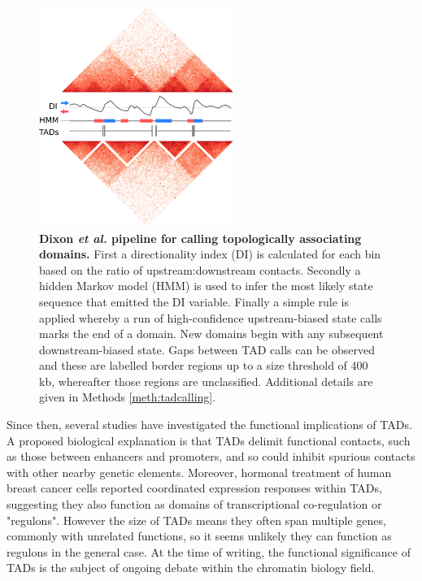 \documentclass[a4paper,11pt,oneside]{book}
\begin{document}
\begin{figure}
\begin{center}
\includegraphics[width=2.5in]{di_example.png}
\captionsetup{width=\textwidth}
\caption[Dixon \emph{et al.} pipeline for calling topologically associating domains.]{ {\bf Dixon \emph{et al.} pipeline for calling topologically associating domains.} First a directionality index (DI) is calculated for each bin based on the ratio of upstream:downstream contacts. Secondly a hidden Markov model (HMM) is used to infer the most likely state sequence that emitted the DI variable. Finally a simple rule is applied whereby a run of high-confidence upstream-biased state calls marks the end of a domain. New domains begin with any subsequent downstream-biased state. Gaps between TAD calls can be observed and these are labelled border regions up to a size threshold of 400 kb, whereafter those regions are unclassified.\cite{Dixon2012} Additional details are given in Methods \ref{meth:tadcalling}.
}\label{fig:dicalc}
\end{center}
\end{figure} 

Since then, several studies have investigated the functional implications of TADs. A proposed biological explanation is that TADs delimit functional contacts, such as those between enhancers and promoters, and so could inhibit spurious contacts with other nearby genetic elements.\cite{Fraser2015, Sexton2015} Moreover, hormonal treatment of human breast cancer cells reported coordinated expression responses within TADs, suggesting they also function as domains of transcriptional co-regulation or "regulons".\cite{LeDily2014} However the size of TADs means they often span multiple genes, commonly with unrelated functions, so it seems unlikely they can function as regulons in the general case.\cite{Pombo2015} At the time of writing, the functional significance of TADs is the subject of ongoing debate within the chromatin biology field.
\end{document}
